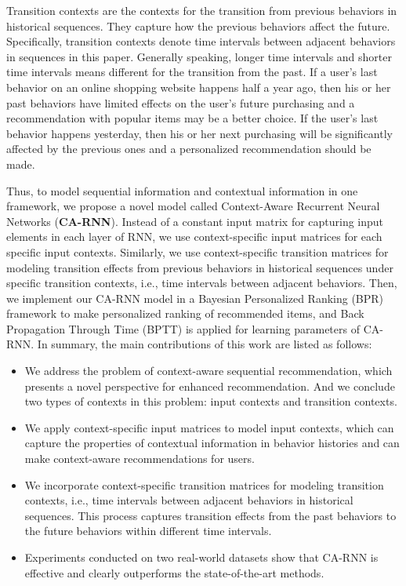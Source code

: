 \documentclass{sig-alternate}
\begin{document}
Transition contexts are the contexts for the transition from previous behaviors in historical sequences. They capture how the previous behaviors affect the future. Specifically, transition contexts denote time intervals between adjacent behaviors in sequences in this paper. Generally speaking, longer time intervals and shorter time intervals means different for the transition from the past. If a user's last behavior on an online shopping website happens half a year ago, then his or her past behaviors have limited effects on the user's future purchasing and a recommendation with popular items may be a better choice. If the user's last behavior happens yesterday, then his or her next purchasing will be significantly affected by the previous ones and a personalized recommendation should be made.

Thus, to model sequential information and contextual information in one framework, we propose a novel model called Context-Aware Recurrent Neural Networks (\textbf{CA-RNN}). Instead of a constant input matrix for capturing input elements in each layer of RNN, we use context-specific input matrices for each specific input contexts. Similarly, we use context-specific transition matrices for modeling transition effects from previous behaviors in historical sequences under specific transition contexts, i.e., time intervals between adjacent behaviors. Then, we implement our CA-RNN model in a Bayesian Personalized Ranking (BPR) \cite{rendle2009bpr} framework to make personalized ranking of recommended items, and Back Propagation Through Time (BPTT) \cite{rumelhart1988learning} is applied for learning parameters of CA-RNN. In summary, the main contributions of this work are listed as follows:

\begin{itemize}
\item
We address the problem of context-aware sequential recommendation, which presents a novel perspective for enhanced recommendation. And we conclude two types of contexts in this problem: input contexts and transition contexts.

\item
We apply context-specific input matrices to model input contexts, which can capture the properties of contextual information in behavior histories and can make context-aware recommendations for users.

\item
We incorporate context-specific transition matrices for modeling transition contexts, i.e., time intervals between adjacent behaviors in historical sequences. This process captures transition effects from the past behaviors to the future behaviors within different time intervals.

\item
Experiments conducted on two real-world datasets show that CA-RNN is effective and clearly outperforms the state-of-the-art methods.

\end{itemize}
\end{document}
